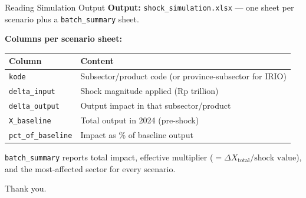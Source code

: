 \documentclass[aspectratio=169]{beamer}
\begin{document}
\begin{frame}{Reading Simulation Output}
\textbf{Output:} \texttt{shock\_simulation.xlsx} --- one sheet per scenario plus a \texttt{batch\_summary} sheet.

\medskip
\textbf{Columns per scenario sheet:}

\medskip
\begin{center}
\begin{tabular}{ll}
\toprule
\textbf{Column} & \textbf{Content} \\
\midrule
\texttt{kode}            & Subsector/product code (or province-subsector for IRIO) \\
\texttt{delta\_input}    & Shock magnitude applied (Rp trillion) \\
\texttt{delta\_output}   & Output impact in that subsector/product \\
\texttt{X\_baseline}     & Total output in 2024 (pre-shock) \\
\texttt{pct\_of\_baseline} & Impact as \% of baseline output \\
\bottomrule
\end{tabular}
\end{center}

\medskip
\texttt{batch\_summary} reports total impact, effective multiplier ($= \Delta X_{\text{total}} / \text{shock value}$), and the most-affected sector for every scenario.
\end{frame}


\begin{frame}{}
\begin{center}
\Large Thank you.
\end{center}
\end{frame}
\end{document}

